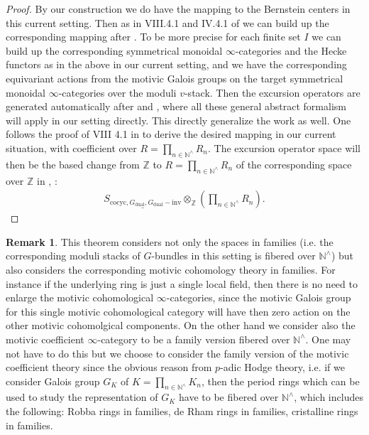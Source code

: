 \documentclass[12pt]{article}
\theoremstyle{definition}
\newtheorem{remark}{Remark}
\begin{document}
\begin{proof}
By our construction we do have the mapping to the Bernstein centers in this current setting. Then as in VIII.4.1 and IV.4.1 of \cite{1FS} we can build up the corresponding mapping after \cite{1VL}. To be more precise for each finite set $I$ we can build up the corresponding symmetrical monoidal $\infty$-categories and the Hecke functors as in the above in our current setting, and we have the corresponding equivariant actions from the motivic Galois groups on the target symmetrical monoidal $\infty$-categories over the moduli $v$-stack. Then the excursion operators are generated automatically after \cite{1FS} and \cite{1VL}, where all these general abstract formalism will apply in our setting directly. This directly generalize the work \cite{2LH} as well. One follows the proof of VIII 4.1 in \cite{1FS} to derive the desired mapping in our current situation, with coefficient over $R=\prod_{n\in \mathbb{N}^\wedge} R_n$. The excursion operator space will then be the based change from $\mathbb{Z}$ to $R=\prod_{n\in \mathbb{N}^\wedge} R_n$ of the corresponding space over $\mathbb{Z}$ in \cite{1S5}, \cite{1S6}:
\begin{align}
\underline{S_{\mathrm{cocyc},G_\mathrm{dual},G_\mathrm{dual}-\mathrm{inv}}}\otimes_\mathbb{Z} \left(\prod_{n\in \mathbb{N}^\wedge} R_n\right).  
\end{align}
\end{proof}


\begin{remark}
This theorem considers not only the spaces in families (i.e. the corresponding moduli stacks of $G$-bundles in this setting is fibered over $\mathbb{N}^\wedge$) but also considers the corresponding motivic cohomology theory in families. For instance if the underlying ring is just a single local field, then there is no need to enlarge the motivic cohomological $\infty$-categories, since the motivic Galois group for this single motivic cohomological category will have then zero action on the other motivic cohomolgical components. On the other hand we consider also the motivic coefficient $\infty$-category to be a family version fibered over $\mathbb{N}^\wedge$. One may not have to do this but we choose to consider the family version of the motivic coefficient theory since the obvious reason from $p$-adic Hodge theory, i.e. if we consider Galois group $G_K$ of $K=\prod_{n\in \mathbb{N}^\wedge} K_n$, then the period rings which can be used to study the representation of $G_K$ have to be fibered over $\mathbb{N}^\wedge$, which includes the following: Robba rings in families, de Rham rings in families, cristalline rings in families. 
\end{remark}
\end{document}

